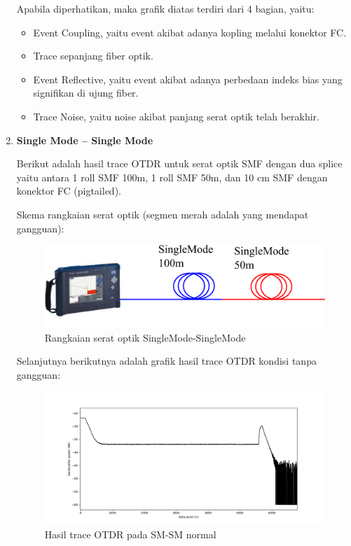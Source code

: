 \documentclass[12pt]{article}
\begin{document}
\begin{enumerate}
		Apabila diperhatikan, maka grafik diatas terdiri dari 4 bagian, yaitu:
		\begin{itemize}
			\item Event Coupling, yaitu event akibat adanya kopling melalui konektor FC.
			\item Trace sepanjang fiber optik.
			\item Event Reflective, yaitu event akibat adanya perbedaan indeks bias yang signifikan di ujung fiber.
			\item Trace Noise, yaitu noise akibat panjang serat optik telah berakhir.
		\end{itemize}
		
		\newpage
		\item \textbf{Single Mode – Single Mode}
		
		Berikut adalah hasil trace OTDR untuk serat optik SMF dengan dua splice yaitu antara 1 roll SMF 100m, 1 roll SMF 50m, dan 10 cm SMF dengan konektor FC (pigtailed).
		
		Skema rangkaian serat optik (segmen merah adalah yang mendapat gangguan):
		
		\begin{figure}[!h]
			\centering
			\captionsetup{justification=centering}
			\includegraphics[width=0.6\linewidth]{images/Bab_4/sm}
			\caption[Trace SMF-SMF]{\small{Rangkaian serat optik SingleMode-SingleMode}}
		\end{figure}
	
		Selanjutnya berikutnya adalah grafik hasil trace OTDR kondisi tanpa gangguan:
		
		\begin{figure}[!h]
			\centering
			\captionsetup{justification=centering}
			\includegraphics[width=\linewidth]{images/Bab_4/Bab_4_3b1}
			\caption[Trace SMF-SMF]{\small{Hasil trace OTDR pada SM-SM normal}}
		\end{figure}
	

\end{enumerate}
\end{document}
